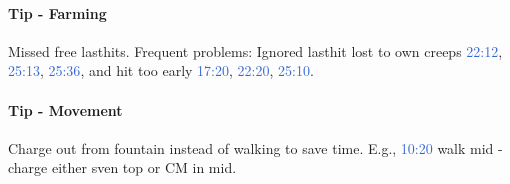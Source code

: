 \documentclass{article}
\newcommand{\logref}[1]{\textcolor{highlight}{#1}}
\begin{document}
\paragraph{Tip - Farming}
Missed free lasthits. Frequent problems: Ignored lasthit lost to own creeps \logref{22:12},  \logref{25:13}, \logref{25:36}, and hit too early \logref{17:20}, \logref{22:20}, \logref{25:10}.

\paragraph{Tip - Movement}
Charge out from fountain instead of walking to save time. E.g.,  \logref{10:20} walk mid - charge either sven top or CM in mid. 
\end{document}
